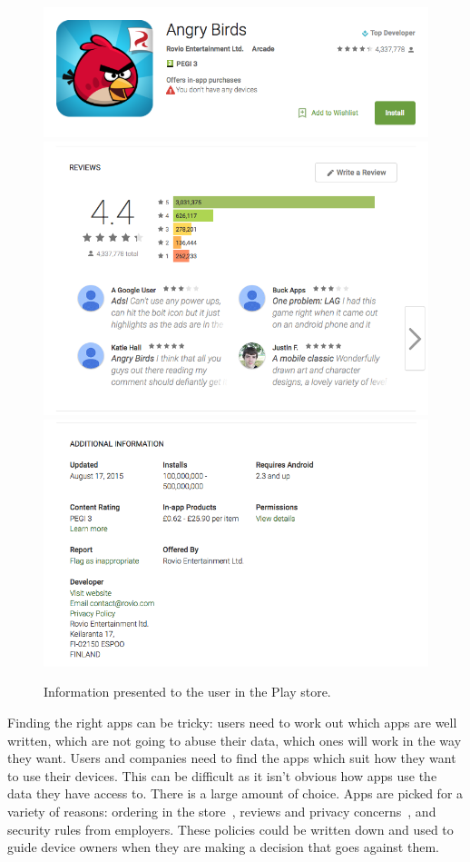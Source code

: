 \documentclass[a4paper]{scrartcl}
\begin{document}
\begin{figure}\centering
  \includegraphics[width=0.8\linewidth]{images/angrybirds.png}
  \includegraphics[width=0.8\linewidth]{images/reviews.png}
  \includegraphics[width=0.8\linewidth]{images/additionalinfo.png}
  \caption{Information presented to the user in the Play store.}
  \label{fig:storeinfo}
\end{figure}

Finding the right apps can be tricky:
  users need to work out which apps are well written, which are not going to abuse their data, which ones will work in the way they want.
Users and companies need to find the apps which suit how they want to use their devices.
This can be difficult as it isn't obvious how apps use the data they have access to.
There is a large amount of choice.
Apps are picked for a variety of reasons:
  ordering in the store~\citep{Prata:2012in},
  reviews and privacy concerns~\citep{Kelley:2013kc},
  and security rules from employers.
These policies could be written down and used to guide device owners when they are making a decision that goes against them.
\end{document}
